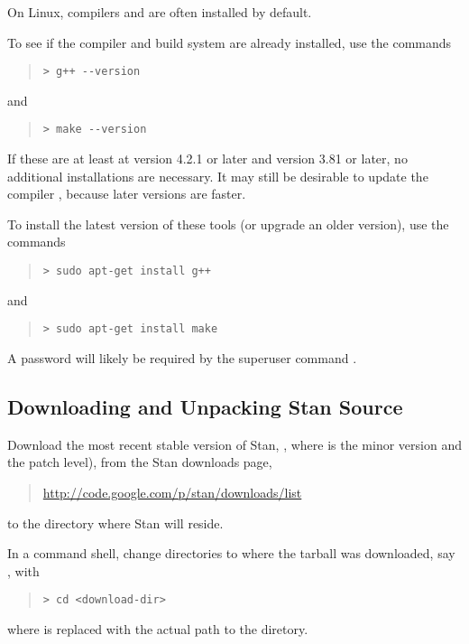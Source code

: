 On Linux, \Cpp compilers and  are often installed by default.

To see if the  compiler and  build system
are already installed, use the commands
%
\begin{quote}
\begin{Verbatim}[fontshape=sl]
> g++ --version
\end{Verbatim}
\end{quote}
% 
and
%
\begin{quote}
\begin{Verbatim}[fontshape=sl]
> make --version
\end{Verbatim}
\end{quote}
%

If these are at least at  version 4.2.1 or later and 
version 3.81 or later, no additional installations are necessary.  It
may still be desirable to update the \Cpp compiler , because
later versions are faster.

To install the latest version of these
tools (or upgrade an older version), use the commands
%
\begin{quote}
\begin{Verbatim}[fontshape=sl]
> sudo apt-get install g++ 
\end{Verbatim}
\end{quote}
%
and
%
\begin{quote}
\begin{Verbatim}[fontshape=sl]
> sudo apt-get install make 
\end{Verbatim}
\end{quote}
% 
A password will likely be required by the superuser command .


\subsection{Downloading and Unpacking Stan Source}

Download the most recent stable version of Stan,
, where  is the minor version and
 the patch level), from the Stan downloads page,
%
\begin{quote}
\url{http://code.google.com/p/stan/downloads/list}
\end{quote}
%
to the directory where Stan will reside.

In a command shell, change directories to where the
tarball was downloaded, say , with
%
\begin{quote}
\begin{Verbatim}[fontshape=sl]
> cd <download-dir>
\end{Verbatim}
\end{quote}
%
where  is replaced with the actual path to the diretory.


